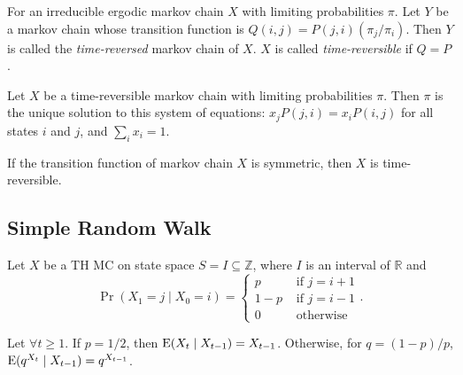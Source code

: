 \documentclass[a4paper, 12pt, fleqn]{article}
\begin{document}
\begin{definition}
For an irreducible ergodic markov chain $X$ with limiting probabilities $\pi$.
Let $Y$ be a markov chain whose transition function is $Q(i, j) = P(j, i)(\pi_j/\pi_i)$.
Then $Y$ is called the \emph{time-reversed} markov chain of $X$.
$X$ is called \emph{time-reversible} if $Q = P$.
\end{definition}

\begin{theorem}
Let $X$ be a time-reversible markov chain with limiting probabilities $\pi$.
Then $\pi$ is the unique solution to this system of equations:
$x_jP(j, i) = x_iP(i, j)$ for all states $i$ and $j$, and $\sum_i x_i = 1$.
\end{theorem}

\begin{theorem}
If the transition function of markov chain $X$ is symmetric, then $X$ is time-reversible.
\end{theorem}

\subsection{Simple Random Walk}

Let $X$ be a TH MC on state space $S = I \subseteq \mathbb{Z}$,
where $I$ is an interval of $\mathbb{R}$ and
\[ \Pr(X_1 = j \mid X_0 = i) = \begin{cases}
p & \textrm{ if } j = i+1
\\ 1-p & \textrm{ if } j = i-1
\\ 0 & \textrm{ otherwise}
\end{cases}. \]

\begin{lemma}
\label{thm:rand-walk:martin}
Let $\forall t \ge 1$. If $p = 1/2$, then $\operatorname*{E}(X_t \mid X_{t-1}) = X_{t-1}$.
Otherwise, for $q = (1-p)/p$, $\operatorname*{E}(q^{X_t} \mid X_{t-1}) = q^{X_{t-1}}$.
\end{lemma}
\end{document}
